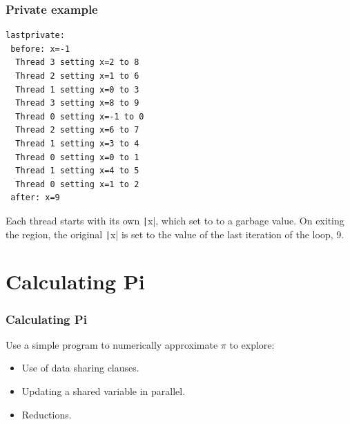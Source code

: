 \documentclass{beamer}
\begin{document}
\begin{frame}[fragile]
\frametitle{Private example}
\begin{verbatim}
lastprivate:
 before: x=-1
  Thread 3 setting x=2 to 8
  Thread 2 setting x=1 to 6
  Thread 1 setting x=0 to 3
  Thread 3 setting x=8 to 9
  Thread 0 setting x=-1 to 0
  Thread 2 setting x=6 to 7
  Thread 1 setting x=3 to 4
  Thread 0 setting x=0 to 1
  Thread 1 setting x=4 to 5
  Thread 0 setting x=1 to 2
 after: x=9
\end{verbatim}
Each thread starts with its own \texttt|x|, which set to to a garbage value.
On exiting the region, the original \texttt|x| is set to the value of the last iteration of the loop, 9.
\end{frame}

%
%

\section{Calculating Pi}
\begin{frame}
\frametitle{Calculating Pi}
Use a simple program to numerically approximate $\pi$ to explore:
\begin{itemize}
  \item Use of data sharing clauses.
  \item Updating a shared variable in parallel.
  \item Reductions.
\end{itemize}
\end{frame}
\end{document}
